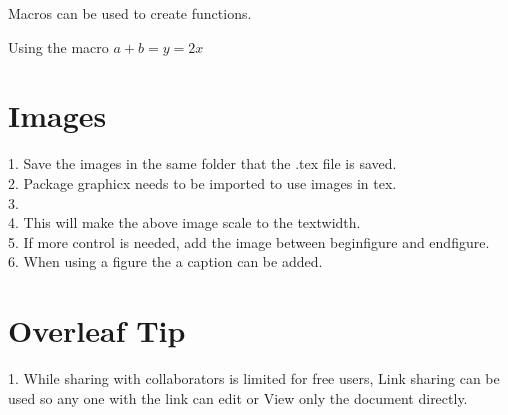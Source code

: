 \documentclass{article}
\begin{document}
Macros can be used to create functions.

\def\eq1{y=2x}

Using the macro
$a + b = \eq1$

\section{Images}

1. Save the images in the same folder that the .tex file is saved.\\
2. Package graphicx needs to be imported to use images in tex.\\
3.\\ %
4. %
This will make the above image scale to the textwidth.\\
5. If more control is needed, add the image between begin{figure} and end{figure}.\\
6. When  using a figure the a caption can be added.

\section{Overleaf Tip}

1. While sharing with collaborators is limited for free users, Link sharing can be used so any one with the link can edit or View only the document directly.
\end{document}
